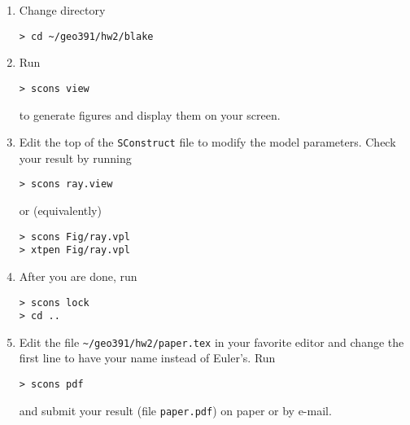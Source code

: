 \begin{enumerate}
\item Change directory 
\begin{verbatim}
> cd ~/geo391/hw2/blake
\end{verbatim}
\item Run
\begin{verbatim}
> scons view
\end{verbatim}
to generate figures and display them on your screen.  
\item Edit the
top of the \texttt{SConstruct} file to modify the model
parameters. Check your result by running
\begin{verbatim}
> scons ray.view
\end{verbatim}
or (equivalently)
\begin{verbatim}
> scons Fig/ray.vpl
> xtpen Fig/ray.vpl
\end{verbatim}
\item After you are done, run
\begin{verbatim}
> scons lock
> cd ..
\end{verbatim}
\item Edit the file
\verb#~/geo391/hw2/paper.tex# in your favorite editor and change the
first line to have your name instead of Euler's. Run
\begin{verbatim}
> scons pdf
\end{verbatim}
and submit your result (file \texttt{paper.pdf}) on paper or by
e-mail.
\end{enumerate}

 
